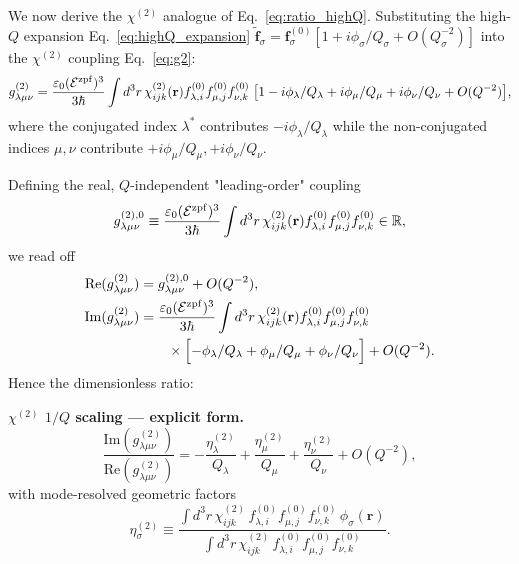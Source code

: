 \documentclass[12pt]{article}
\newcommand{\zpf}{{\rm zpf}}
\newcommand{\tf}{\tilde{\mathbf{f}}}
\begin{document}
We now derive the $\chi^{(2)}$ analogue of Eq.~\eqref{eq:ratio_highQ}.
Substituting the high-$Q$ expansion Eq.~\eqref{eq:highQ_expansion}
$\tf_\sigma = \mathbf{f}^{(0)}_\sigma[1 + i\phi_\sigma/Q_\sigma + O(Q_\sigma^{-2})]$
into the $\chi^{(2)}$ coupling Eq.~\eqref{eq:g2}:
\begin{equation}
  g^{(2)}_{\lambda\mu\nu} =
  \frac{\varepsilon_0(\mathcal{E}^\zpf)^3}{3\hbar}
  \int d^3r\,\chi^{(2)}_{ijk}(\mathbf{r})
  f^{(0)}_{\lambda,i}f^{(0)}_{\mu,j}f^{(0)}_{\nu,k}
  \;\bigl[1 - i\phi_\lambda/Q_\lambda + i\phi_\mu/Q_\mu + i\phi_\nu/Q_\nu
  + O(Q^{-2})\bigr],
  \label{eq:g2_expand}
\end{equation}
where the conjugated index $\lambda^*$ contributes $-i\phi_\lambda/Q_\lambda$
while the non-conjugated indices $\mu,\nu$ contribute $+i\phi_\mu/Q_\mu,
+i\phi_\nu/Q_\nu$.

Defining the real, $Q$-independent "leading-order" coupling
\begin{equation}
  g^{(2),0}_{\lambda\mu\nu} \equiv
  \frac{\varepsilon_0(\mathcal{E}^\zpf)^3}{3\hbar}
  \int d^3r\,\chi^{(2)}_{ijk}(\mathbf{r})
  f^{(0)}_{\lambda,i}f^{(0)}_{\mu,j}f^{(0)}_{\nu,k}
  \in\mathbb{R},
\end{equation}
we read off
\begin{align}
  \mathrm{Re}(g^{(2)}_{\lambda\mu\nu})
  &= g^{(2),0}_{\lambda\mu\nu} + O(Q^{-2}),
  \\
  \mathrm{Im}(g^{(2)}_{\lambda\mu\nu})
  &= \frac{\varepsilon_0(\mathcal{E}^\zpf)^3}{3\hbar}
  \int d^3r\,\chi^{(2)}_{ijk}(\mathbf{r})
  f^{(0)}_{\lambda,i}f^{(0)}_{\mu,j}f^{(0)}_{\nu,k}
  \nonumber\\&\qquad\times
  \Bigl[-\phi_\lambda/Q_\lambda+\phi_\mu/Q_\mu+\phi_\nu/Q_\nu\Bigr]
  + O(Q^{-2}).
\end{align}
Hence the dimensionless ratio:
\begin{keyresult}
\textbf{$\chi^{(2)}$ $1/Q$ scaling --- explicit form.}
\begin{equation}
  \boxed{\frac{\mathrm{Im}(g^{(2)}_{\lambda\mu\nu})}
              {\mathrm{Re}(g^{(2)}_{\lambda\mu\nu})}
  = -\frac{\eta^{(2)}_\lambda}{Q_\lambda}
    +\frac{\eta^{(2)}_\mu}{Q_\mu}
    +\frac{\eta^{(2)}_\nu}{Q_\nu}
  + O(Q^{-2}),}
  \label{eq:chi2_explicit_scaling}
\end{equation}
with mode-resolved geometric factors
\begin{equation}
  \eta^{(2)}_\sigma \equiv
  \frac{\int d^3r\,\chi^{(2)}_{ijk}\,
        f^{(0)}_{\lambda,i}f^{(0)}_{\mu,j}f^{(0)}_{\nu,k}\,
        \phi_\sigma(\mathbf{r})}
       {\int d^3r\,\chi^{(2)}_{ijk}\,
        f^{(0)}_{\lambda,i}f^{(0)}_{\mu,j}f^{(0)}_{\nu,k}}.
  \label{eq:eta_chi2}
\end{equation}
\end{keyresult}
\end{document}
